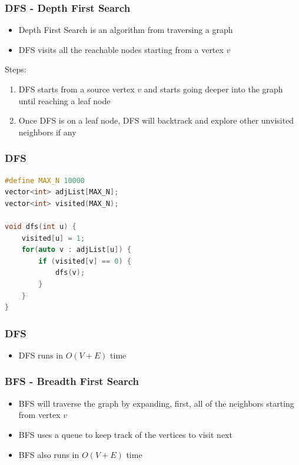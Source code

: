 \documentclass{beamer}
\begin{document}
\begin{frame}[fragile]
\frametitle{DFS - Depth First Search}

\begin{itemize}
    \item Depth First Search is an algorithm from traversing a graph
    \item DFS visits all the reachable nodes starting from a vertex $v$
\end{itemize}

\vspace{0.3cm}

Steps:

\begin{enumerate}
    \item DFS starts from a source vertex $v$ and starts going deeper into the graph until reaching a leaf node
    \item Once DFS is on a leaf node, DFS will backtrack and explore other unvisited neighbors if any
\end{enumerate}

\end{frame}

\begin{frame}[fragile]
\frametitle{DFS}

\begin{lstlisting}[language=c]
#define MAX_N 10000
vector<int> adjList[MAX_N];
vector<int> visited(MAX_N);

void dfs(int u) {
	visited[u] = 1;
	for(auto v : adjList[u]) {
		if (visited[v] == 0) {
			dfs(v);
		}
	}
}

\end{lstlisting}

\end{frame}

\begin{frame}[fragile]
\frametitle{DFS}

\begin{itemize}
    \item DFS runs in $O(V+E)$ time
\end{itemize}

\end{frame}


\begin{frame}[fragile]
\frametitle{BFS - Breadth First Search}

\begin{itemize}
    \item BFS will traverse the graph by expanding, first, all of the neighbors starting from vertex $v$
	\item BFS uses a queue to keep track of the vertices to visit next
	\item BFS also runs in $O(V+E)$ time
\end{itemize}

\end{frame}
\end{document}
